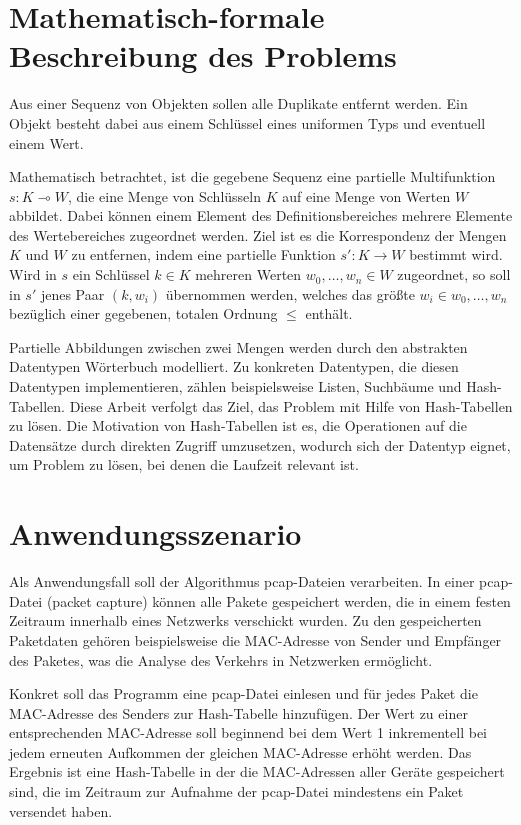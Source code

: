 \chapter{Mathematisch-formale Beschreibung des Problems}
Aus einer Sequenz von Objekten sollen alle Duplikate entfernt werden. Ein Objekt besteht dabei aus einem Schlüssel eines uniformen Typs und eventuell einem Wert. 

Mathematisch betrachtet, ist die gegebene Sequenz eine partielle Multifunktion \(s: K\multimap{W}\), die eine Menge von Schlüsseln \(K\) auf eine Menge von Werten \(W\) abbildet. Dabei können einem Element des Definitionsbereiches mehrere Elemente des Wertebereiches zugeordnet werden. Ziel ist es die Korrespondenz der Mengen \(K\) und \(W\) zu entfernen, indem eine partielle Funktion \(s': K\to{W}\) bestimmt wird. Wird in \(s\) ein Schlüssel \(k\in{K}\) mehreren Werten \(w_{0}, \dots{}, w_{n}\in{W}\) zugeordnet, so soll in \(s'\) jenes Paar \((k, w_{i})\) übernommen werden, welches das größte \(w_{i}\in{w_{0}, \dots{}, w_{n}}\) bezüglich einer gegebenen, totalen Ordnung \(\le\) enthält.

Partielle Abbildungen zwischen zwei Mengen werden durch den abstrakten Datentypen Wörterbuch modelliert. Zu konkreten Datentypen, die diesen Datentypen implementieren, zählen beispielsweise Listen, Suchbäume und Hash-Tabellen. Diese Arbeit verfolgt das Ziel, das Problem mit Hilfe von Hash-Tabellen zu lösen. Die Motivation von Hash-Tabellen ist es, die Operationen auf die Datensätze durch direkten Zugriff umzusetzen, wodurch sich der Datentyp eignet, um Problem zu lösen, bei denen die Laufzeit relevant ist.

\chapter{Anwendungsszenario}
Als Anwendungsfall soll der Algorithmus pcap-Dateien verarbeiten. In einer pcap-Datei (packet capture) können alle Pakete gespeichert werden, die in einem festen Zeitraum innerhalb eines Netzwerks verschickt wurden. Zu den gespeicherten Paketdaten gehören beispielsweise die MAC-Adresse von Sender und Empfänger des Paketes, was die Analyse des Verkehrs in Netzwerken ermöglicht. 

Konkret soll das Programm eine pcap-Datei einlesen und für jedes Paket die MAC-Adresse des Senders zur Hash-Tabelle hinzufügen. Der Wert zu einer entsprechenden MAC-Adresse soll beginnend bei dem Wert 1 inkrementell bei jedem erneuten Aufkommen der gleichen MAC-Adresse erhöht werden. Das Ergebnis ist eine Hash-Tabelle in der die MAC-Adressen aller Geräte gespeichert sind, die im Zeitraum zur Aufnahme der pcap-Datei mindestens ein Paket versendet haben. 

